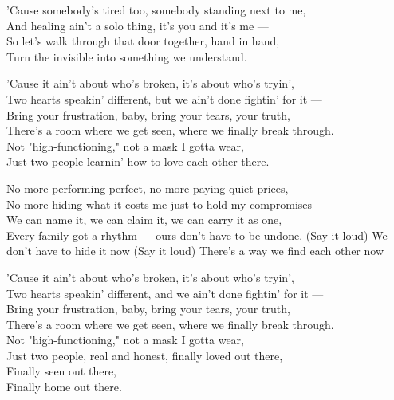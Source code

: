 \begin{lyrics}
'Cause somebody's tired too, somebody standing next to me,\\
And healing ain't a solo thing, it's you and it's me —\\
So let's walk through that door together, hand in hand,\\
Turn the invisible into something we understand.

'Cause it ain't about who's broken, it's about who's tryin',\\
Two hearts speakin' different, but we ain't done fightin' for it —\\
Bring your frustration, baby, bring your tears, your truth,\\
There's a room where we get seen, where we finally break through.\\
Not "high-functioning," not a mask I gotta wear,\\
Just two people learnin' how to love each other there.

No more performing perfect, no more paying quiet prices,\\
No more hiding what it costs me just to hold my compromises —\\
We can name it, we can claim it, we can carry it as one,\\
Every family got a rhythm — ours don't have to be undone.
(Say it loud) We don't have to hide it now
(Say it loud) There's a way we find each other now

'Cause it ain't about who's broken, it's about who's tryin',\\
Two hearts speakin' different, and we ain't done fightin' for it —\\
Bring your frustration, baby, bring your tears, your truth,\\
There's a room where we get seen, where we finally break through.\\
Not "high-functioning," not a mask I gotta wear,\\
Just two people, real and honest, finally loved out there,\\
Finally seen out there,\\
Finally home out there.
\end{lyrics}

